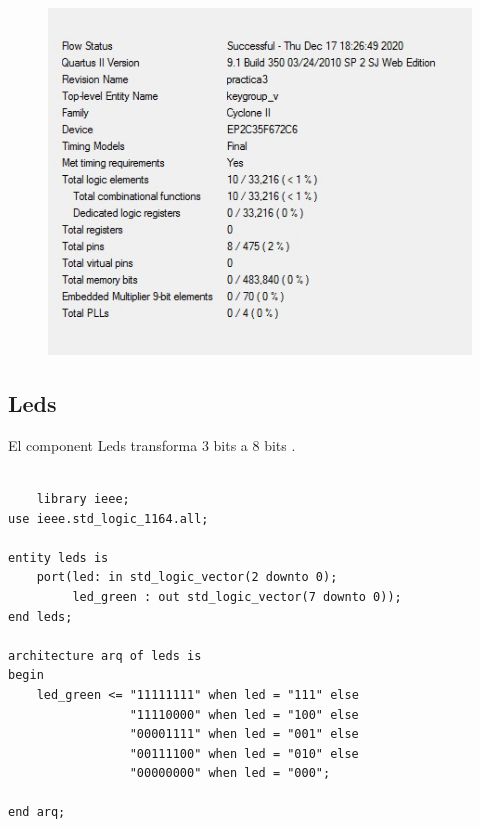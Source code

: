 \documentclass[12pt, a4papre]{article}
\begin{document}
	
			\begin{figure}[H]
		\begin{center}
		\includegraphics[width=130mm]{informeKeygroup.jpeg}
		\end{center}
	\end{figure}	
	
	\subsection{Leds}
	
	El component Leds transforma 3 bits a 8 bits .
	
		\begin{lstlisting}[style=vhdl, frame=single, basicstyle=\tiny]
		
	library ieee;
use ieee.std_logic_1164.all;

entity leds is
	port(led: in std_logic_vector(2 downto 0);
		 led_green : out std_logic_vector(7 downto 0));
end leds;

architecture arq of leds is
begin
	led_green <= "11111111" when led = "111" else
				 "11110000" when led = "100" else
				 "00001111" when led = "001" else
				 "00111100" when led = "010" else
				 "00000000" when led = "000";
				 
end arq;

		\end{lstlisting}
		
\end{document}
